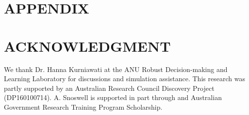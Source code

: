 \documentclass[letterpaper, 10 pt, conference]{ieeeconf}
\begin{document}
\lipsum[1]








\section*{APPENDIX}

\lipsum[1]

\section*{ACKNOWLEDGMENT}

We thank Dr. Hanna Kurniawati at the ANU Robust Decision-making and Learning Laboratory for discussions and simulation assistance.  This research was partly supported by an Australian Research Council Discovery Project (DP160100714).  A. Snoswell is supported in part through and Australian Government Research Training Program Scholarship. 





\end{document}
